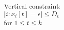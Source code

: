 \documentclass[preview]{standalone}
\begin{document}
\begin{center}
Vertical constraint:\\
            $|i:x_i[t] = \epsilon| \le D_v $\\
            for $1 \le t \le k$
\end{center}
\end{document}
